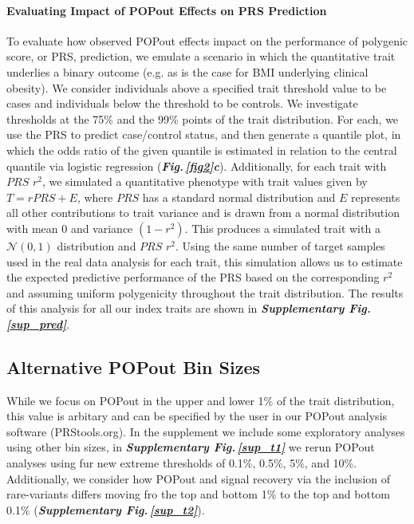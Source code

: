\documentclass[12pt]{zHenriquesLab-StyleBioRxiv}
\newcommand\dref[2]{\normalsize{\textbf{\textit{Fig.\,\ref{#1}#2}}}\normalsize{}}
\newcommand\sref[1]{\normalsize{\textbf{\textit{Supplementary Fig.\,\ref{#1}}}}\normalsize{}}
\begin{document}
{{\paragraph*{Evaluating Impact of POPout Effects on PRS Prediction} 
To evaluate how observed POPout effects impact on the performance of 
polygenic score, or PRS, prediction, we emulate a scenario in which the 
quantitative trait underlies a binary outcome (e.g. as is the case for BMI 
underlying clinical obesity). We consider individuals above a specified 
trait threshold value to be cases and individuals below the threshold to 
be controls. We investigate thresholds at the 75\% and the 99\% points of 
the trait distribution. For each, we use the PRS to predict case/control 
status, and then generate a quantile plot, in which the odds ratio of the 
given quantile is estimated in relation to the central quantile via logistic 
regression (\dref{fig2}{c}). Additionally, for each trait with $PRS$ $r^2$, we simulated 
a quantitative phenotype with trait values given by $T=r{PRS}+E$, where 
$PRS$ has a standard normal distribution and $E$ represents all other contributions 
to trait variance and is drawn from a normal distribution with mean 0 and 
variance $(1-r^2)$. This produces a simulated trait with a $\mathcal{N}(0,1)$ 
distribution and $PRS$ $r^2$. Using the same number of target samples 
used in the real data analysis for each trait, this simulation allows us to 
estimate the expected predictive performance of the PRS based on the 
corresponding $r^2$ and assuming uniform polygenicity throughout the 
trait distribution.  The results of this analysis for all our index traits 
are shown in \sref{sup_pred}. 


{\color{blue} 
\subsection*{Alternative POPout Bin Sizes} 

While we focus on POPout in the upper and lower 1\% of the trait distribution, this value is arbitary 
and can be specified by the user in our POPout analysis software (PRStools.org).  In the supplement we include some 
exploratory analyses using other bin sizes, in \sref{sup_t1} we rerun POPout analyses using fur new 
extreme thresholds of 0.1\%, 0.5\%, 5\%, and 10\%.  Additionally, we consider how POPout and signal 
recovery via the inclusion of rare-variants differs moving fro the top and bottom 1\% to the top and 
bottom 0.1\% (\sref{sup_t2}). 






}}}
\end{document}
